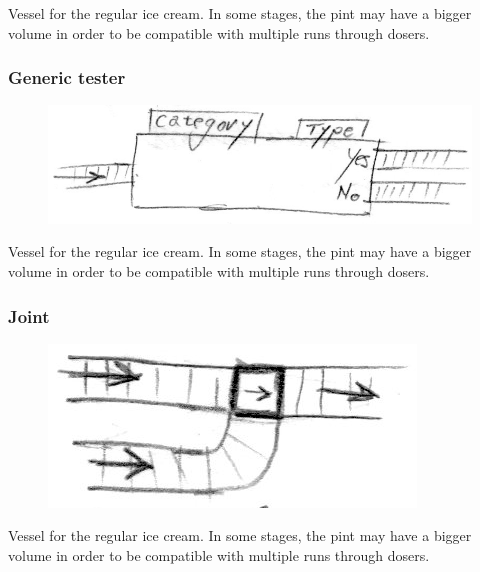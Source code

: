 \documentclass[a4paper]{scrartcl}
\begin{document}
            Vessel for the regular ice cream. In some stages, the pint may have
            a bigger volume in order to be compatible with multiple runs through
            dosers.

        \subsubsection{Generic tester}
            \begin{figure}
                \vspace{-20pt}
                \includegraphics[scale=1]{devices/generic_conditional}
                \vspace{-20pt}
            \end{figure}
            
            Vessel for the regular ice cream. In some stages, the pint may have
            a bigger volume in order to be compatible with multiple runs through
            dosers.

        \subsubsection{Joint}
            \begin{figure}
                \vspace{-20pt}
                \includegraphics[scale=1]{devices/joint}
                \vspace{-20pt}
            \end{figure}
            
            Vessel for the regular ice cream. In some stages, the pint may have
            a bigger volume in order to be compatible with multiple runs through
            dosers.
\end{document}
